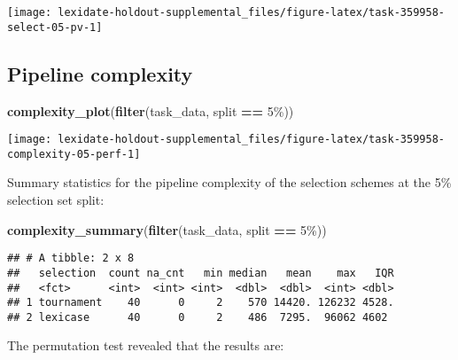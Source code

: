 \documentclass[
]{book}
\newenvironment{Shaded}{\begin{snugshade}}{\end{snugshade}}
\newcommand{\FunctionTok}[1]{\textcolor[rgb]{0.13,0.29,0.53}{\textbf{#1}}}
\newcommand{\NormalTok}[1]{#1}
\newcommand{\SpecialCharTok}[1]{\textcolor[rgb]{0.81,0.36,0.00}{\textbf{#1}}}
\newcommand{\StringTok}[1]{\textcolor[rgb]{0.31,0.60,0.02}{#1}}
\begin{document}
\texttt{[image: lexidate-holdout-supplemental\_files/figure-latex/task-359958-select-05-pv-1]}

\hypertarget{pipeline-complexity-29}{%
\subsection{Pipeline complexity}\label{pipeline-complexity-29}}

\begin{Shaded}
\begin{Highlighting}[]
\FunctionTok{complexity\_plot}\NormalTok{(}\FunctionTok{filter}\NormalTok{(task\_data, split }\SpecialCharTok{==} \StringTok{\textquotesingle{}5\%\textquotesingle{}}\NormalTok{))}
\end{Highlighting}
\end{Shaded}

\texttt{[image: lexidate-holdout-supplemental\_files/figure-latex/task-359958-complexity-05-perf-1]}

Summary statistics for the pipeline complexity of the selection schemes at the 5\% selection set split:

\begin{Shaded}
\begin{Highlighting}[]
\FunctionTok{complexity\_summary}\NormalTok{(}\FunctionTok{filter}\NormalTok{(task\_data, split }\SpecialCharTok{==} \StringTok{\textquotesingle{}5\%\textquotesingle{}}\NormalTok{))}
\end{Highlighting}
\end{Shaded}

\begin{verbatim}
## # A tibble: 2 x 8
##   selection  count na_cnt   min median   mean    max   IQR
##   <fct>      <int>  <int> <int>  <dbl>  <dbl>  <int> <dbl>
## 1 tournament    40      0     2    570 14420. 126232 4528.
## 2 lexicase      40      0     2    486  7295.  96062 4602
\end{verbatim}

The permutation test revealed that the results are:
\end{document}
